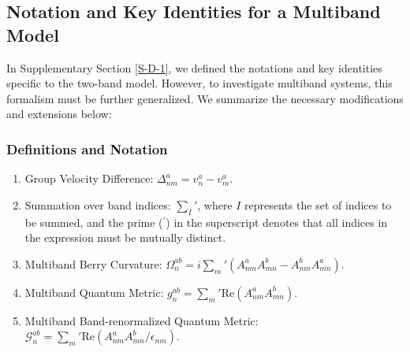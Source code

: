 \documentclass[twocolumn, prx, reprint, amsfonts, amsmath, amssymb, longbibliography, floatfix, aps]{revtex4-2}
\begin{document}
\subsection{Notation and Key Identities for a Multiband Model}
In Supplementary Section \ref{S-D-1}, we defined the notations and key identities specific to the two-band model. However, to investigate multiband systems, this formalism must be further generalized. We summarize the necessary modifications and extensions below:

\subsubsection*{Definitions and Notation}
\begin{enumerate}
	\item Group Velocity Difference: $\Delta^a_{nm} = v^a_n - v^a_m$.
    \item Summation over band indices: $\sum_{I}'$, where $I$ represents the set of indices to be summed, and the prime ($^\prime$) in the superscript denotes that all indices in the expression must be mutually distinct.
	\item Multiband Berry Curvature: $\Omega^{ab}_{n} = i\sum_{m}' (A^a_{nm}A^b_{mn} - A^b_{nm}A^a_{mn})$.
	\item Multiband Quantum Metric: $g^{ab}_n = \sum_{m}'\text{Re}(A^a_{nm}A^{b}_{mn})$.
	\item Multiband Band-renormalized Quantum Metric: $\mathcal{G}^{ab}_n = \sum_{m}' \text{Re}(A^a_{nm}A^{b}_{mn}/\epsilon_{nm})$.
\end{enumerate}
\end{document}
